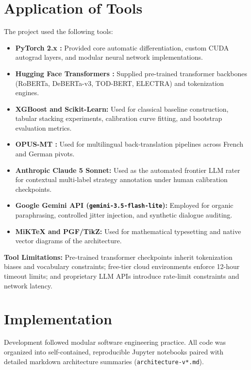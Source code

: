 \section{Application of Tools}
\label{sec:tools}

The project used the following tools:
\begin{itemize}
  \item \textbf{PyTorch 2.x \cite{paszke2019pytorch}:} Provided core automatic differentiation, custom CUDA autograd layers, and modular neural network implementations.
  \item \textbf{Hugging Face Transformers \cite{wolf2020transformers}:} Supplied pre-trained transformer backbones (RoBERTa, DeBERTa-v3, TOD-BERT, ELECTRA) and tokenization engines.
  \item \textbf{XGBoost \cite{chen2016xgboost} and Scikit-Learn:} Used for classical baseline construction, tabular stacking experiments, calibration curve fitting, and bootstrap evaluation metrics.
  \item \textbf{OPUS-MT \cite{tiedemann2020opusmt}:} Used for multilingual back-translation pipelines across French and German pivots.
  \item \textbf{Anthropic Claude 5 Sonnet:} Used as the automated frontier LLM rater for contextual multi-label strategy annotation under human calibration checkpoints.
  \item \textbf{Google Gemini API (\texttt{gemini-3.5-flash-lite}):} Employed for organic paraphrasing, controlled jitter injection, and synthetic dialogue auditing.
  \item \textbf{MiKTeX and PGF/TikZ:} Used for mathematical typesetting and native vector diagrams of the architecture.
\end{itemize}
\textbf{Tool Limitations:} Pre-trained transformer checkpoints inherit tokenization biases and vocabulary constraints; free-tier cloud environments enforce 12-hour timeout limits; and proprietary LLM APIs introduce rate-limit constraints and network latency.

\section{Implementation}
\label{sec:implementation}

Development followed modular software engineering practice. All code was organized into self-contained, reproducible Jupyter notebooks paired with detailed markdown architecture summaries (\texttt{architecture-v*.md}). 

